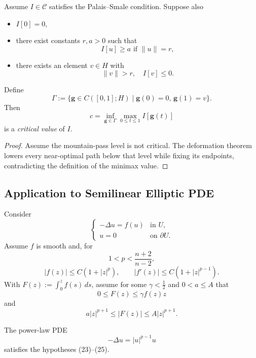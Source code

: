\begin{theorem}
\label{thm:mountain-pass-theorem}
Assume $I \in \mathcal{C}$ satisfies the Palais--Smale condition. Suppose also
\begin{itemize}
\item[(i)] $I[0] = 0$,
\item[(ii)] there exist constants $r, a > 0$ such that
\[
I[u] \geq a \text{ if } \|u\| = r,
\]
\item[(iii)] there exists an element $v \in H$ with
\[
\|v\| > r, \quad I[v] \leq 0.
\]
\end{itemize}
Define
\[
\Gamma := \{\mathbf{g} \in C([0,1]; H) \mid \mathbf{g}(0) = 0, \, \mathbf{g}(1) = v\}.
\]
Then
\[
c = \inf_{\mathbf{g} \in \Gamma} \max_{0 \le t \le 1} I[\mathbf{g}(t)]
\]
is a \textit{critical value} of $I$.
\end{theorem}

\begin{proof}
\sketch Assume the mountain-pass level is not critical. The deformation theorem lowers every near-optimal path below that level while fixing its endpoints, contradicting the definition of the minimax value.
\end{proof}

\subsection{Application to Semilinear Elliptic PDE}
\label{sec:semilinear-elliptic-application}

Consider
\[
\begin{cases}
-\Delta u=f(u) & \text{in }U,\\
u=0 & \text{on }\partial U.
\end{cases}
\tag{22}
\]
Assume $f$ is smooth and, for
\[
1<p<\frac{n+2}{n-2},
\]
\[
|f(z)|\leq C(1+|z|^p),
\qquad
|f'(z)|\leq C(1+|z|^{p-1}).
\tag{23}
\]
With $F(z):=\int_0^z f(s)\,ds$, assume for some $\gamma<\frac12$ and $0<a\leq A$ that
\[
0\leq F(z)\leq\gamma f(z)z
\tag{24}
\]
and
\[
a|z|^{p+1}\leq|F(z)|\leq A|z|^{p+1}.
\tag{25}
\]

\begin{remark}
\label{rem:power-nonlinearity-semilinear-example}
The power-law PDE
\[
-\Delta u = |u|^{p-1}u
\]
satisfies the hypotheses (23)--(25).
\end{remark}


